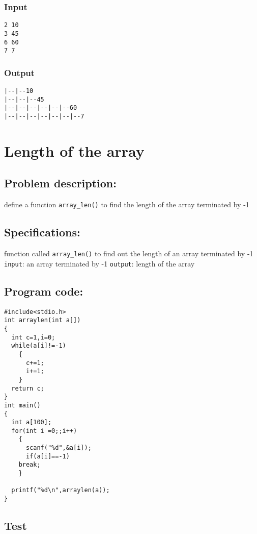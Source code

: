 \documentclass[11pt]{article}
\begin{document}
\subsubsection*{Input}
\label{sec-1-4-1}
\begin{verbatim}
2 10
3 45
6 60
7 7
\end{verbatim}

\subsubsection*{Output}
\label{sec-1-4-2}
\begin{verbatim}
|--|--10
|--|--|--45   
|--|--|--|--|--|--60
|--|--|--|--|--|--|--7
\end{verbatim}

\section{Length of the array}
\label{sec-2}

\subsection*{Problem description:}
\label{sec-2-1}
define a function \texttt{array\_len()} to find the length of 
the array terminated by -1
\subsection*{Specifications:}
\label{sec-2-2}
function called \texttt{array\_len()} to find out the length of an array
terminated by -1
\texttt{input}: an array terminated by -1
\texttt{output}: length of the array

\subsection*{Program code:}
\label{sec-2-3}

\begin{verbatim}
#include<stdio.h>
int arraylen(int a[])
{
  int c=1,i=0;
  while(a[i]!=-1)
    {
      c+=1;
      i+=1;
    }
  return c;
}
int main()
{
  int a[100];
  for(int i =0;;i++)
    {
      scanf("%d",&a[i]);
      if(a[i]==-1)
	break;
    }

  printf("%d\n",arraylen(a));
}
\end{verbatim}
\subsection*{Test}
\label{sec-2-4}
\end{document}
